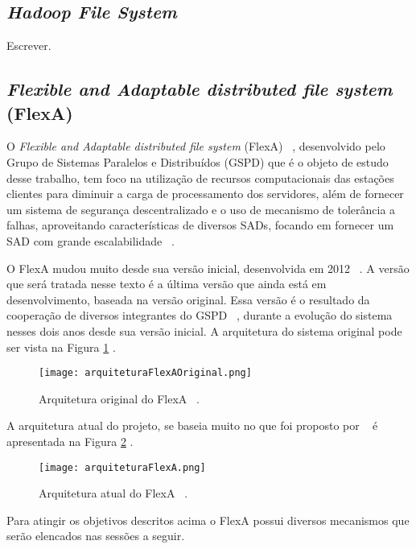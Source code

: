     \subsection{\textit{Hadoop File System}}
    
    Escrever.
    
    \subsection{\textit{Flexible and Adaptable distributed file system} (FlexA)}
	 
	 O \textit{Flexible and Adaptable distributed file system} (FlexA) ~\cite{silas}, desenvolvido pelo Grupo de Sistemas Paralelos e Distribuídos (GSPD) que é o objeto de estudo desse trabalho, tem foco na utilização de recursos computacionais das estações clientes para diminuir a carga de processamento dos servidores, além de fornecer um sistema de segurança descentralizado e o uso de mecanismo de tolerância a falhas, aproveitando características de diversos SADs, focando em fornecer um SAD com grande escalabilidade ~\cite{silas}.
	
	 O FlexA mudou muito desde sua versão inicial, desenvolvida em 2012 ~\cite{mario}. A versão que será tratada nesse texto é a última versão que ainda está em desenvolvimento, baseada na versão original. Essa versão é o resultado da cooperação de diversos integrantes do GSPD ~\cite{mario}, durante a evolução do sistema nesses dois anos desde sua versão inicial. A arquitetura do sistema original pode ser vista na Figura \ref{fig:arquiteturaFlexaOriginal} .
	 
	 \begin{figure}
	 \centering
	 \texttt{[image: arquiteturaFlexAOriginal.png]}
	 \caption{Arquitetura original do FlexA ~\cite{silas}.}
	 \label{fig:arquiteturaFlexaOriginal}
	 \end{figure}
	 
	 A arquitetura atual do projeto, se baseia muito no que foi proposto por ~\cite{silas} é apresentada na Figura \ref{fig:arquiteturaFlexa} .
	 
	 \begin{figure}
	 \centering
	 \texttt{[image: arquiteturaFlexA.png]}
	 \caption{Arquitetura atual do FlexA ~\cite{mario}.}
	 \label{fig:arquiteturaFlexa}
	 \end{figure}
	 
	 Para atingir os objetivos descritos acima o FlexA possui diversos mecanismos que serão elencados nas sessões a seguir.
	 
